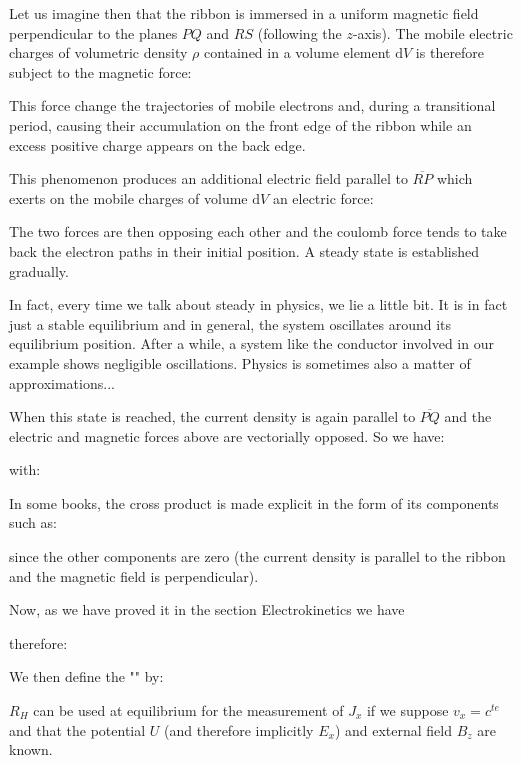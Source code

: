 	Let us imagine then that the ribbon is immersed in a uniform magnetic field perpendicular to the planes $PQ$ and $RS$ (following the $z$-axis). The mobile electric charges of volumetric density $\rho$ contained in a volume element $\mathrm{d}V$ is therefore subject to the magnetic force:
	
	This force change the trajectories of mobile electrons and, during a transitional period, causing their accumulation on the front edge of the ribbon while an excess positive charge appears on the back edge.

	This phenomenon produces an additional electric field parallel to $\overline{RP}$ which exerts on the mobile charges of volume $\mathrm{d}V$ an electric force:
	
	The two forces are then opposing each other and the coulomb force tends to take back the electron paths in their initial position. A steady state is established gradually.
	\begin{tcolorbox}[title=Remark,colframe=black,arc=10pt]
	In fact, every time we talk about steady in physics, we lie a little bit. It is in fact just a stable equilibrium and in general, the system oscillates around its equilibrium position. After a while, a system like the conductor involved in our example shows negligible oscillations. Physics is sometimes also a matter of approximations...
	\end{tcolorbox}
	When this state is reached, the current density is again parallel to $\overline{PQ}$ and the electric and magnetic forces above are vectorially opposed. So we have:
	
	with:
	
	In some books, the cross product is made explicit in the form of its components such as:
	
	since the other components are zero (the current density is parallel to the ribbon and the magnetic field is perpendicular).

	Now, as we have proved it in the section Electrokinetics we have
	
	therefore:
	
	We then define the "" by:
	
	$R_H$ can be used at equilibrium for the measurement of $J_x$ if we suppose $v_x=c^{te}$ and that the potential $U$ (and therefore implicitly $E_x$) and external field $B_z$ are known.  

